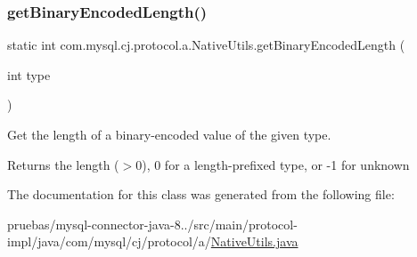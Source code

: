 \subsubsection{\texorpdfstring{get\+Binary\+Encoded\+Length()}{getBinaryEncodedLength()}}
{\footnotesize\ttfamily static int com.\+mysql.\+cj.\+protocol.\+a.\+Native\+Utils.\+get\+Binary\+Encoded\+Length (\begin{DoxyParamCaption}\item[{int}]{type }\end{DoxyParamCaption})\hspace{0.3cm}{\ttfamily [static]}}

Get the length of a binary-\/encoded value of the given type.

\begin{DoxyReturn}{Returns}
the length ($>$0), 0 for a length-\/prefixed type, or -\/1 for unknown 
\end{DoxyReturn}


The documentation for this class was generated from the following file\+:\begin{DoxyCompactItemize}
\item 
pruebas/mysql-\/connector-\/java-\/8../src/main/protocol-\/impl/java/com/mysql/cj/protocol/a/\mbox{\hyperlink{_native_utils_8java}{Native\+Utils.\+java}}\end{DoxyCompactItemize}
